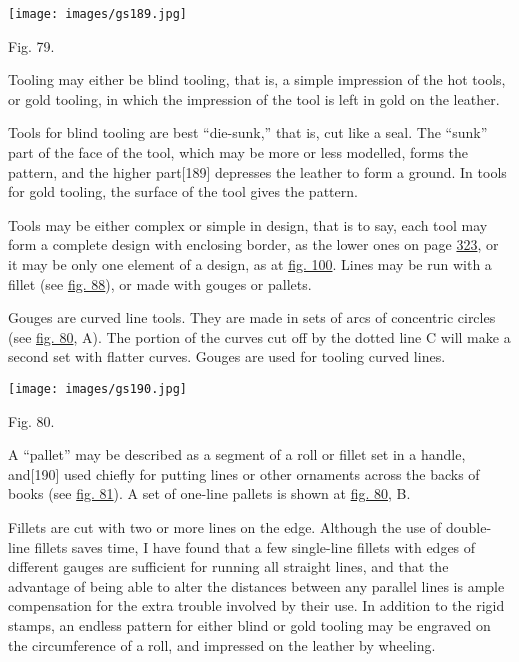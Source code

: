 \documentclass[
]{article}
\begin{document}
\protect\hypertarget{Fig_79}{}{}
\texttt{[image: images/gs189.jpg]}

Fig. 79.

Tooling may either be blind tooling, that is, a simple impression of the
hot tools, or gold tooling, in which the impression of the tool is left
in gold on the leather.

Tools for blind tooling are best ``die-sunk,'' that is, cut like a seal.
The ``sunk'' part of the face of the tool, which may be more or less
modelled, forms the pattern, and the higher
part{\protect\hypertarget{Page_189}{}{{[}189{]}}} depresses the leather
to form a ground. In tools for gold tooling, the surface of the tool
gives the pattern.

Tools may be either complex or simple in design, that is to say, each
tool may form a complete design with enclosing border, as the lower ones
on page \protect\hyperlink{Page_323}{323}, or it may be only one element
of a design, as at \protect\hyperlink{Fig_100}{fig. 100}. Lines may be
run with a fillet (see \protect\hyperlink{Fig_88}{fig. 88}), or made
with gouges or pallets.

Gouges are curved line tools. They are made in sets of arcs of
concentric circles (see \protect\hyperlink{Fig_80}{fig. 80}, A). The
portion of the curves cut off by the dotted line C will make a second
set with flatter curves. Gouges are used for tooling curved lines.

\protect\hypertarget{Fig_80}{}{}
\texttt{[image: images/gs190.jpg]}

Fig. 80.

A ``pallet'' may be described as a segment of a roll or fillet set in a
handle, and{\protect\hypertarget{Page_190}{}{{[}190{]}}} used chiefly
for putting lines or other ornaments across the backs of books (see
\protect\hyperlink{Fig_81}{fig. 81}). A set of one-line pallets is shown
at \protect\hyperlink{Fig_80}{fig. 80}, B.

Fillets are cut with two or more lines on the edge. Although the use of
double-line fillets saves time, I have found that a few single-line
fillets with edges of different gauges are sufficient for running all
straight lines, and that the advantage of being able to alter the
distances between any parallel lines is ample compensation for the extra
trouble involved by their use. In addition to the rigid stamps, an
endless pattern for either blind or gold tooling may be engraved on the
circumference of a roll, and impressed on the leather by wheeling.
\end{document}
